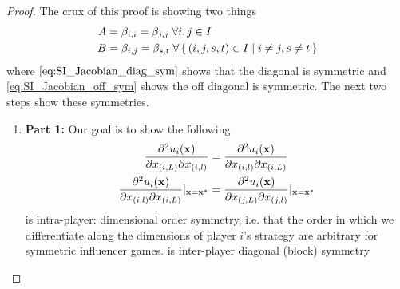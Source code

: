 \documentclass{article}
\begin{document}
            \begin{proof}
                The crux of this proof is showing two things 
                \begin{align}
                    A&=\beta_{i,i}=\beta_{j,j} \; \forall i,j\in I \label{eq:SI_Jacobian_diag_sym} \\ %
                    B&= \beta_{i,j}=\beta_{s,t} \; \forall \set{(i,j,s,t)\in I|i\neq j, s\neq t} \label{eq:SI_Jacobian_off_sym} 
                \end{align}
                where $\cref{eq:SI_Jacobian_diag_sym}$ shows that the diagonal is symmetric and \cref{eq:SI_Jacobian_off_sym} shows the off diagonal is symmetric. The next two steps show these symmetries. 
                \begin{enumerate}
                    \item[] \textbf{Part 1:} Our goal is to show the following
                    \begin{align}
                        \pdv[2]{u_i(\mathbf{x})}{x_{(i,L)}}{x_{(i,l)}}&=\pdv[2]{u_i(\mathbf{x})}{x_{(i,l)}}{x_{(i,L)}} \label{eq:SI_Jacobian_intra_dim_sym}\\ %
                        \pdv[2]{u_i(\mathbf{x})}{x_{(i,l)}}{x_{(i,L)}}|_{\mathbf{x}=\mathbf{x}^*}&=\pdv[2]{u_i(\mathbf{x})}{x_{(j,L)}}{x_{(j,l)}}|_{\mathbf{x}=\mathbf{x}^*} \label{eq:SI_Jacobian_inter_player_diag_sym}
                    \end{align}
                      is intra-player: dimensional order symmetry, i.e. that the order in which we differentiate along the dimensions of player $i$'s strategy are arbitrary for symmetric influencer games.  is inter-player diagonal (block) symmetry
                     

\end{enumerate}
\end{proof}
\end{document}
